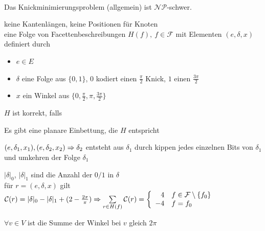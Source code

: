 \vspace*{-0.5\baselineskip}\\
Das Knickminimierungsproblem (allgemein) ist $\mathcal{NP}$-schwer.
\begin{description}[itemsep=-1pt]
	\item[orthogonale Beschreibung $(H)$] keine Kantenlängen, keine Positionen für Knoten\\
	eine Folge von Facettenbeschreibungen $H(f),~f\in \mathcal{F}$ mit Elementen $(e,\delta,x)$ definiert durch
	\begin{itemize}[itemsep=-2pt]
		\item $e\in E$
		\item $\delta$ eine Folge aus $\{0,1\}$, $0$ kodiert einen $\frac{\pi}{2}$ Knick, $1$ einen $\frac{3\pi}{2}$
		\item $x$ ein Winkel aus $\{0,\frac{\pi}{2},\pi,\frac{3\pi}{2}\}$
	\end{itemize}
	$H$ ist korrekt, falls
		\begin{description}[itemsep=-2pt]
			\item[O1] Es gibt eine planare Einbettung, die $H$ entspricht
			\item[O2] $(e,\delta_1,x_1),(e,\delta_2,x_2)\\
			\Rightarrow \delta_2$ entsteht aus $\delta_1$ durch kippen jedes einzelnen Bits von $\delta_1$ und umkehren der Folge $\delta_1$
			\item[O3] $|\delta|_0$, $|\delta|_1$ sind die Anzahl der $0/1$ in $\delta$\\
			für $r=(e,\delta,x)$ gilt $\mathcal{C}(r)=|\delta|_0-|\delta|_1+(2-\frac{2x}{\pi})\\
			\Rightarrow \sum\limits_{r\in H(f)}\mathcal{C}(r)=\left\{
				\begin{array}{rl}
					4&f\in \mathcal{F}\setminus\{f_0\}\\
					-4&f=f_0
				\end{array}
			\right.$
			\item[O4] $\forall v\in V$ ist die Summe der Winkel bei $v$ gleich $2\pi$
		\end{description}
\end{description}
